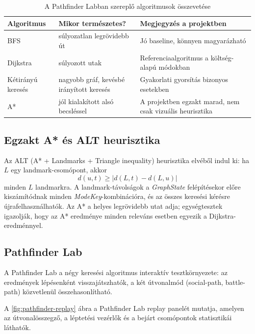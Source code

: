 \begin{table}[H]
\centering
\caption{A Pathfinder Labban szereplő algoritmusok összevetése}
\label{tab:pathfinder-algorithms}
\begin{tabularx}{\textwidth}{|>{\raggedright\arraybackslash}p{2.8cm}|>{\raggedright\arraybackslash}p{2.8cm}|X|}
\hline
\textbf{Algoritmus} & \textbf{Mikor természetes?} & \textbf{Megjegyzés a projektben} \\
\hline
BFS & súlyozatlan legrövidebb út & Jó baseline, könnyen magyarázható \\
Dijkstra & súlyozott utak & Referenciaalgoritmus a költség-alapú módokban \\
Kétirányú keresés & nagyobb gráf, kevésbé irányított keresés & Gyakorlati gyorsítás bizonyos esetekben \\
A* & jól kialakított alsó becsléssel & A projektben egzakt marad, nem csak vizuális heurisztika \\
\hline
\end{tabularx}
\end{table}

\subsection{Egzakt A* és ALT heurisztika}

Az ALT (A* + Landmarks + Triangle inequality) heurisztika \cite{goldberg2005} elvéből indul ki: ha $L$ egy landmark-csomópont, akkor
\begin{equation}
d(u, t) \geq |d(L, t) - d(L, u)|
\end{equation}
minden $L$ landmarkra. A landmark-távolságok a \textit{GraphState} felépítésekor előre kiszámítódnak minden \textit{ModeKey}-kombinációra, és az összes keresési kérésre újrafelhasználhatók. Az A* a helyes legrövidebb utat adja; egységtesztek igazolják, hogy az A* eredménye minden releváns esetben egyezik a Dijkstra-eredménnyel.

\subsection{Pathfinder Lab}

A Pathfinder Lab a négy keresési algoritmus interaktív tesztkörnyezete: az eredmények lépésenként visszajátszhatók, a két útvonalmód (social-path, battle-path) közvetlenül összehasonlítható.

A \ref{fig:pathfinder-replay} ábra a Pathfinder Lab replay panelét mutatja, amelyen az útvonalösszegző, a léptetési vezérlők és a bejárt csomópontok statisztikái láthatók.

